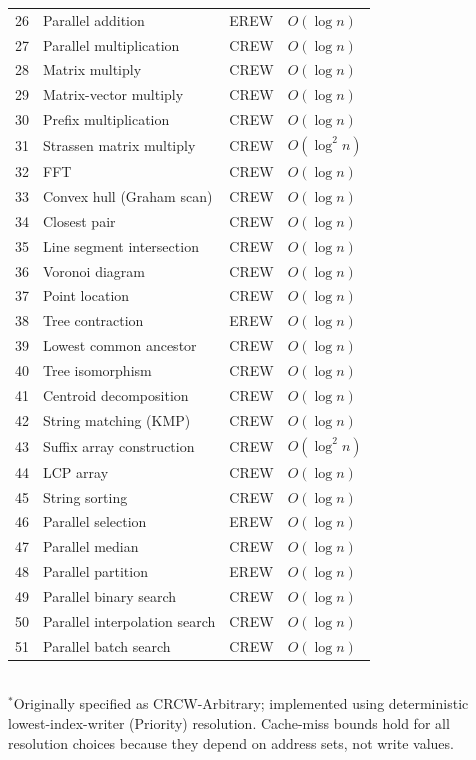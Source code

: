 \documentclass[11pt]{article}
\begin{document}
\begin{table}[p]
\begin{tabular}{@{}rlll@{}}
\midrule
26 & Parallel addition & EREW & $O(\log n)$ \\
27 & Parallel multiplication & CREW & $O(\log n)$ \\
28 & Matrix multiply & CREW & $O(\log n)$ \\
29 & Matrix-vector multiply & CREW & $O(\log n)$ \\
30 & Prefix multiplication & CREW & $O(\log n)$ \\
31 & Strassen matrix multiply & CREW & $O(\log^2 n)$ \\
32 & FFT & CREW & $O(\log n)$ \\
\midrule
33 & Convex hull (Graham scan) & CREW & $O(\log n)$ \\
34 & Closest pair & CREW & $O(\log n)$ \\
35 & Line segment intersection & CREW & $O(\log n)$ \\
36 & Voronoi diagram & CREW & $O(\log n)$ \\
37 & Point location & CREW & $O(\log n)$ \\
\midrule
38 & Tree contraction & EREW & $O(\log n)$ \\
39 & Lowest common ancestor & CREW & $O(\log n)$ \\
40 & Tree isomorphism & CREW & $O(\log n)$ \\
41 & Centroid decomposition & CREW & $O(\log n)$ \\
\midrule
42 & String matching (KMP) & CREW & $O(\log n)$ \\
43 & Suffix array construction & CREW & $O(\log^2 n)$ \\
44 & LCP array & CREW & $O(\log n)$ \\
45 & String sorting & CREW & $O(\log n)$ \\
\midrule
46 & Parallel selection & EREW & $O(\log n)$ \\
47 & Parallel median & CREW & $O(\log n)$ \\
48 & Parallel partition & EREW & $O(\log n)$ \\
\midrule
49 & Parallel binary search & CREW & $O(\log n)$ \\
50 & Parallel interpolation search & CREW & $O(\log n)$ \\
51 & Parallel batch search & CREW & $O(\log n)$ \\
\bottomrule
\end{tabular}
\\[4pt]
\footnotesize $^*$Originally specified as CRCW-Arbitrary; implemented using deterministic
lowest-index-writer (Priority) resolution.  Cache-miss bounds hold for all
resolution choices because they depend on address sets, not write values.
\end{table}
\end{document}
